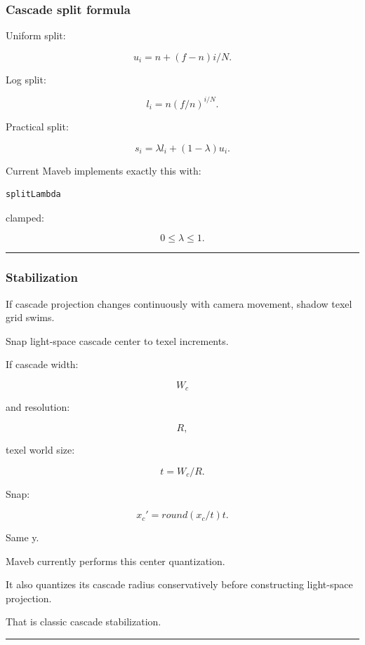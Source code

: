 \subsubsection{Cascade split formula}\label{cascade-split-formula}

Uniform split:

\[
u_i=
n+(f-n)i/N.
\]

Log split:

\[
l_i=
n(f/n)^{i/N}.
\]

Practical split:

\[
\boxed{
s_i=
\lambda l_i+
(1-\lambda)u_i.
}
\]

Current Maveb implements exactly this with:

\begin{verbatim}
splitLambda
\end{verbatim}

clamped:

\[
0\le\lambda\le1.
\]

\begin{center}\rule{0.5\linewidth}{0.5pt}\end{center}

\subsubsection{Stabilization}\label{stabilization}

If cascade projection changes continuously with camera movement, shadow texel grid swims.

Snap light-space cascade center to texel increments.

If cascade width:

\[
W_c
\]

and resolution:

\[
R,
\]

texel world size:

\[
t=
W_c/R.
\]

Snap:

\[
\boxed{
x_c'
=
round(x_c/t)t.
}
\]

Same y.

Maveb currently performs this center quantization.

It also quantizes its cascade radius conservatively before constructing light-space projection.

That is classic cascade stabilization.

\begin{center}\rule{0.5\linewidth}{0.5pt}\end{center}

